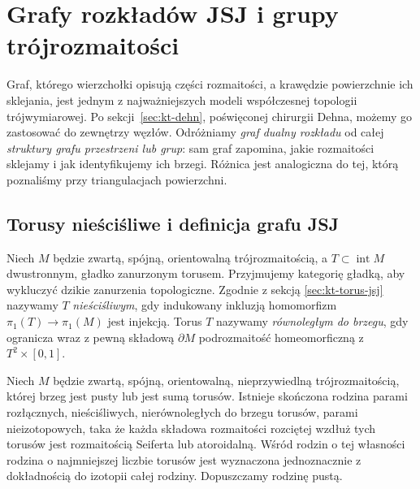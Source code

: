\chapter{Grafy rozkładów JSJ i grupy trójrozmaitości}
\label{ch:tg-jsj-graphs}

Graf, którego wierzchołki opisują części rozmaitości,
a krawędzie powierzchnie ich sklejania, jest jednym z
najważniejszych modeli współczesnej topologii
trójwymiarowej. Po sekcji~\ref{sec:kt-dehn}, poświęconej
chirurgii Dehna, możemy go zastosować do zewnętrzy węzłów.
Odróżniamy \emph{graf dualny rozkładu}
od całej \emph{struktury grafu przestrzeni lub grup}:
sam graf zapomina, jakie rozmaitości sklejamy i jak
identyfikujemy ich brzegi. Różnica jest analogiczna
do tej, którą poznaliśmy przy triangulacjach powierzchni.

\section{Torusy nieściśliwe i definicja grafu JSJ}
\label{sec:tg-jsj-graph-def}

\begin{definicja}
Niech $M$ będzie zwartą, spójną, orientowalną
trójrozmaitością, a $T\subset\operatorname{int}M$
dwustronnym, gładko zanurzonym torusem.
Przyjmujemy kategorię gładką, aby wykluczyć dzikie
zanurzenia topologiczne. Zgodnie z sekcją
\ref{sec:kt-torus-jsj} nazywamy $T$ \emph{nieściśliwym},
gdy indukowany inkluzją homomorfizm
$\pi_1(T)\to\pi_1(M)$ jest injekcją.
Torus $T$ nazywamy \emph{równoległym do brzegu},
gdy ogranicza wraz z pewną składową $\partial M$
podrozmaitość homeomorficzną z $T^2\times[0,1]$.
\end{definicja}

\begin{twierdzenie}
\label{thm:tg-jsj-theorem}
Niech $M$ będzie zwartą, spójną, orientowalną,
nieprzywiedlną trójrozmaitością, której brzeg jest
pusty lub jest sumą torusów. Istnieje skończona
rodzina parami rozłącznych, nieściśliwych,
nierównoległych do brzegu torusów, parami
nieizotopowych, taka że każda składowa rozmaitości
rozciętej wzdłuż tych torusów jest rozmaitością
Seiferta lub atoroidalną. Wśród rodzin o tej
własności rodzina o najmniejszej liczbie torusów jest wyznaczona
jednoznacznie z dokładnością do izotopii całej rodziny.
Dopuszczamy rodzinę pustą.
\end{twierdzenie}


